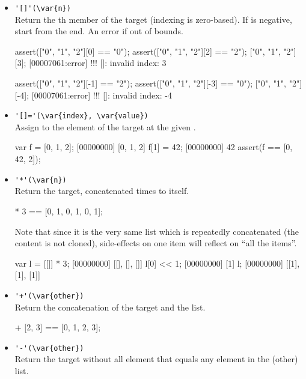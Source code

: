 \begin{itemize}
\item \lstinline|'[]'(\var{n})|\\
  Return the th member of the target (indexing is
  zero-based). If  is negative, start from the end.  An error
  if out of bounds.

\begin{urbiscript}[firstnumber=last]
assert(["0", "1", "2"][0] == "0");
assert(["0", "1", "2"][2] == "2");
["0", "1", "2"][3];
[00007061:error] !!! []: invalid index: 3

assert(["0", "1", "2"][-1] == "2");
assert(["0", "1", "2"][-3] == "0");
["0", "1", "2"][-4];
[00007061:error] !!! []: invalid index: -4
\end{urbiscript}

\item \lstinline|'[]='(\var{index}, \var{value})|\\
  Assign  to the element of the target at the given
  .

\begin{urbiscript}[firstnumber=last]
var f = [0, 1, 2];
[00000000] [0, 1, 2]
f[1] = 42;
[00000000] 42
assert(f == [0, 42, 2]);
\end{urbiscript}

\item \lstinline|'*'(\var{n})|\\
  Return the target, concatenated  times to itself.
\begin{urbiassert}[firstnumber=last]
[0, 1] * 3 == [0, 1, 0, 1, 0, 1];
\end{urbiassert}

  Note that since it is the very same list which is repeatedly
  concatenated (the content is not cloned), side-effects on one item
  will reflect on ``all the items''.

\begin{urbiscript}[firstnumber=last]
var l = [[]] * 3;
[00000000] [[], [], []]
l[0] << 1;
[00000000] [1]
l;
[00000000] [[1], [1], [1]]
\end{urbiscript}

\item \lstinline|'+'(\var{other})|\\
Return the concatenation of the target and the  list.

\begin{urbiassert}[firstnumber=last]
[0, 1] + [2, 3] == [0, 1, 2, 3];
\end{urbiassert}

\item \lstinline|'-'(\var{other})|\\
Return the target without all element that equals any element in the
\var(other) list.


\end{itemize}
